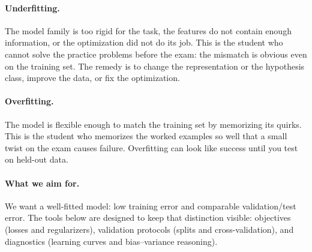 \paragraph{Underfitting.}
The model family is too rigid for the task, the features do not contain enough information, or the optimization did not do its job. This is the student who cannot solve the practice problems before the exam: the mismatch is obvious even on the training set. The remedy is to change the representation or the hypothesis class, improve the data, or fix the optimization.

\paragraph{Overfitting.}
The model is flexible enough to match the training set by memorizing its quirks. This is the student who memorizes the worked examples so well that a small twist on the exam causes failure. Overfitting can look like success until you test on held-out data.

\paragraph{What we aim for.}
We want a well-fitted model: low training error and comparable validation/test error. The tools below are designed to keep that distinction visible: objectives (losses and regularizers), validation protocols (splits and cross-validation), and diagnostics (learning curves and bias--variance reasoning).


